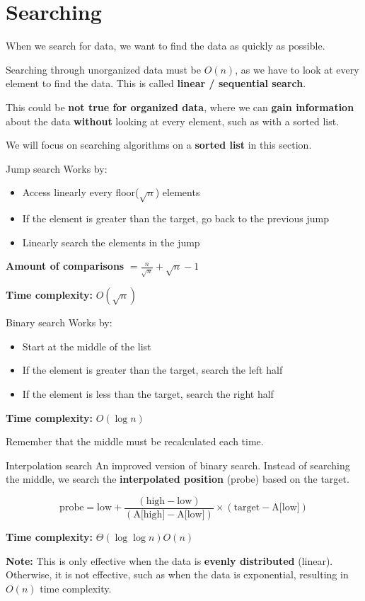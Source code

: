 \section{Searching}

When we search for data, we want to find the data as quickly as possible.

Searching through unorganized data must be $O(n)$, as we have to look at every element to find the data. This is called \textbf{linear / sequential search}.

This could be \textbf{not true for organized data}, where we can \textbf{gain information} about the data \textbf{without} looking at every element, such as with a sorted list.

We will focus on searching algorithms on a \textbf{sorted list} in this section.

\begin{definition}
    {Jump search}
    Works by:
    \begin{itemize}
        \item Access linearly every floor($\sqrt{n}$) elements
        \item If the element is greater than the target, go back to the previous jump
        \item Linearly search the elements in the jump
    \end{itemize}
    \textbf{Amount of comparisons} $=\frac{n}{\sqrt{n}} + \sqrt{n} - 1$

    \textbf{Time complexity:} $O(\sqrt{n})$
\end{definition}

\begin{definition}
    {Binary search}
    Works by:
    \begin{itemize}
        \item Start at the middle of the list
        \item If the element is greater than the target, search the left half
        \item If the element is less than the target, search the right half
    \end{itemize}

    \textbf{Time complexity:}  $O(\log n)$

    Remember that the middle must be recalculated each time.
\end{definition}

\begin{theorem}
    {Interpolation search}
    An improved version of binary search. Instead of searching the middle, we search the \textbf{interpolated position} (probe) based on the target.

    \[ \text{probe} = \text{low} + \frac{(\text{high} - \text{low})}{(\text{A[high]} - \text{A[low]})} \times (\text{target} - \text{A[low]}) \]

    \textbf{Time complexity:} $\Theta(\log \log n) O(n)$

    \textbf{Note:} This is only effective when the data is \textbf{evenly distributed} (linear). Otherwise, it is not effective, such as when the data is exponential, resulting in $O(n)$ time complexity.
\end{theorem}

